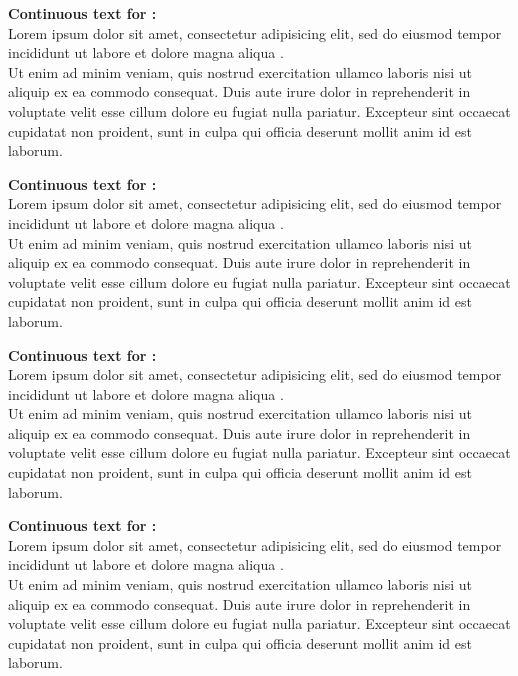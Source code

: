 \documentclass{scrartcl}
\begin{document}
\bigskip

\noindent\textbf{\textsf{Continuous text for} :}\\
Lorem ipsum dolor sit amet, consectetur adipisicing elit, 
sed \halfNote do eiusmod tempor incididunt ut labore et dolore magna aliqua \halfNote*.\\
\halfNote Ut enim ad minim veniam, quis nostrud exercitation ullamco laboris nisi ut aliquip 
ex ea commodo consequat. Duis aute irure dolor in reprehenderit in voluptate velit esse 
cillum dolore eu fugiat nulla pariatur\halfNote. 
\halfNote Excepteur sint occaecat cupidatat non proident, sunt in culpa qui officia deserunt mollit anim id est laborum.

\bigskip

\noindent\textbf{\textsf{Continuous text for} :}\\
Lorem ipsum dolor sit amet, consectetur adipisicing elit,
sed \halfNoteDotted do eiusmod tempor incididunt ut labore et dolore magna aliqua \halfNoteDotted*.\\
\halfNoteDotted Ut enim ad minim veniam, quis nostrud exercitation ullamco laboris nisi ut aliquip
ex ea commodo consequat. Duis aute irure dolor in reprehenderit in voluptate velit esse
cillum dolore eu fugiat nulla pariatur\halfNoteDotted.
\halfNoteDotted Excepteur sint occaecat cupidatat non proident, sunt in culpa qui officia deserunt mollit anim id est laborum.

\bigskip

\noindent\textbf{\textsf{Continuous text for} :}\\
Lorem ipsum dolor sit amet, consectetur adipisicing elit, 
sed \quaver do eiusmod tempor incididunt ut labore et dolore magna aliqua \quaver*.\\
\quaver Ut enim ad minim veniam, quis nostrud exercitation ullamco laboris nisi ut aliquip 
ex ea commodo consequat. Duis aute irure dolor in reprehenderit in voluptate velit esse 
cillum dolore eu fugiat nulla pariatur\quaver. 
\quaver Excepteur sint occaecat cupidatat non proident, sunt in culpa qui officia deserunt mollit anim id est laborum.

\bigskip

\noindent\textbf{\textsf{Continuous text for} :}\\
Lorem ipsum dolor sit amet, consectetur adipisicing elit,
sed \quaverDotted do eiusmod tempor incididunt ut labore et dolore magna aliqua \quaverDotted*.\\
\quaverDotted Ut enim ad minim veniam, quis nostrud exercitation ullamco laboris nisi ut aliquip
ex ea commodo consequat. Duis aute irure dolor in reprehenderit in voluptate velit esse
cillum dolore eu fugiat nulla pariatur\quaverDotted.
\quaverDotted Excepteur sint occaecat cupidatat non proident, sunt in culpa qui officia deserunt mollit anim id est laborum.
\end{document}
